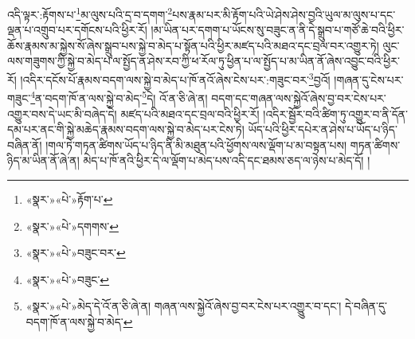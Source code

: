 འདི་ལྟར་:རྟོགས་པ་\footnote{«སྣར་»«པེ་»རྟོག་པ་}མ་ལུས་པའི་དྲ་བ་དགག་\footnote{«སྣར་»«པེ་»དགགས་}པས་རྣམ་པར་མི་རྟོག་པའི་ཡེ་ཤེས་ཤེས་བྱའི་ཡུལ་མ་ལུས་པ་དང་ལྡན་པ་འགྲུབ་པར་དགོངས་པའི་ཕྱིར་རོ། །མ་ཡིན་པར་དགག་པ་ཡོངས་སུ་བཟུང་ན་ནི་དེ་སྒྲུབ་པ་གཙོ་ཆེ་བའི་ཕྱིར་ཆོས་རྣམས་མ་སྐྱེས་སོ་ཞེས་སྒྲུབ་པས་སྐྱེ་བ་མེད་པ་སྟོན་པའི་ཕྱིར་མཛད་པའི་མཐའ་དང་བྲལ་བར་འགྱུར་ཏེ། ལུང་ལས་གཟུགས་ཀྱི་སྐྱེ་བ་མེད་པ་ལ་སྤྱོད་ན་ཤེས་རབ་ཀྱི་ཕ་རོལ་ཏུ་ཕྱིན་པ་ལ་སྤྱོད་པ་མ་ཡིན་ནོ་ཞེས་འབྱུང་བའི་ཕྱིར་རོ། །འདིར་དངོས་པོ་རྣམས་བདག་ལས་སྐྱེ་བ་མེད་པ་ཁོ་ནའོ་ཞེས་ངེས་པར་:གཟུང་བར་\footnote{«སྣར་»«པེ་»བཟུང་བར་}བྱའོ། །གཞན་དུ་ངེས་པར་གཟུང་\footnote{«སྣར་»«པེ་»བཟུང་}ན་བདག་ཁོ་ན་ལས་སྐྱེ་བ་མེད་\footnote{«སྣར་»«པེ་»མེད་དེ་འོ་ན་ཅི་ཞེ་ན། གཞན་ལས་སྐྱེའོ་ཞེས་བྱ་བར་ངེས་པར་འགྱུུར་བ་དང་། དེ་བཞིན་དུ་བདག་ཁོ་ན་ལས་སྐྱེ་བ་མེད་}དེ། འོ་ན་ཅི་ཞེ་ན། བདག་དང་གཞན་ལས་སྐྱེའོ་ཞེས་བྱ་བར་ངེས་པར་འགྱུར་བས་དེ་ཡང་མི་བཞེད་དེ། མཛད་པའི་མཐའ་དང་བྲལ་བའི་ཕྱིར་རོ། །འདིར་སྦྱོར་བའི་ཚིག་ཏུ་འགྱུར་བ་ནི་དོན་དམ་པར་ནང་གི་སྐྱེ་མཆེད་རྣམས་བདག་ལས་སྐྱེ་བ་མེད་པར་ངེས་ཏེ། ཡོད་པའི་ཕྱིར་དཔེར་ན་ཤེས་པ་ཡོད་པ་ཉིད་བཞིན་ནོ། །གལ་ཏེ་གཏན་ཚིགས་ཡོད་པ་ཉིད་ནི་མི་མཐུན་པའི་ཕྱོགས་ལས་ལྡོག་པ་མ་བསྟན་པས། གཏན་ཚིགས་ཉིད་མ་ཡིན་ནོ་ཞེ་ན། མེད་པ་ཁོ་ནའི་ཕྱིར་དེ་ལ་ལྡོག་པ་མེད་པས་འདི་དང་ཐམས་ཅད་ལ་ཉེས་པ་མེད་དོ། །
